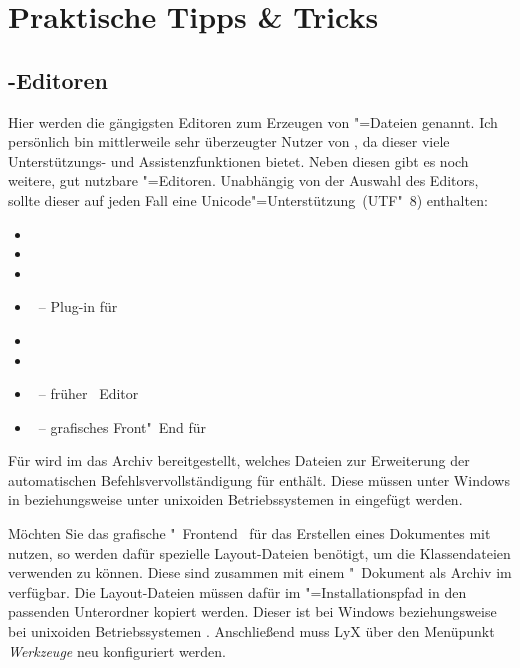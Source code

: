 \newcommand*\TaT{\hyperref[sec:tips]{Tipps \& Tricks}:\xspace}
\chapter{Praktische Tipps \& Tricks}
%
\section{-Editoren}
%
%
Hier werden die gängigsten Editoren zum Erzeugen von "=Dateien 
genannt. Ich persönlich bin mittlerweile sehr überzeugter Nutzer von 
, da dieser viele Unterstützungs- und 
Assistenzfunktionen bietet. Neben diesen gibt es noch weitere, gut nutzbare 
"=Editoren. Unabhängig von der Auswahl des Editors, sollte dieser 
auf jeden Fall eine Unicode"=Unterstützung~(UTF"~8) enthalten:
%
\begin{itemize}
\item {}
\item {}
\item {}
\item {}~-- Plug-in für 
\item {}
\item {}
\item {}~-- früher ~Editor
\item {}~-- grafisches Front"~End für 
\end{itemize}
%
Für  wird im \GitHubRepo* das Archiv 
bereitgestellt, welches Dateien zur Erweiterung der automatischen 
Befehlsvervollständigung für \TUDScript enthält. Diese müssen unter Windows in 
 beziehungsweise unter unixoiden 
Betriebssystemen in  eingefügt werden.

Möchten Sie das grafische "~Frontend~ 
für das Erstellen eines Dokumentes mit \TUDScript nutzen, so werden dafür 
spezielle Layout-Dateien benötigt, um die Klassendateien verwenden zu können. 
Diese sind zusammen mit einem "~Dokument als Archiv 
im \GitHubRepo* verfügbar. Die Layout-Dateien müssen dafür im 
"=Installationspfad in den passenden Unterordner 
kopiert werden. Dieser ist bei Windows
beziehungsweise bei unixoiden Betriebssystemen .
Anschließend muss LyX über den Menüpunkt \emph{Werkzeuge} neu konfiguriert 
werden. 



